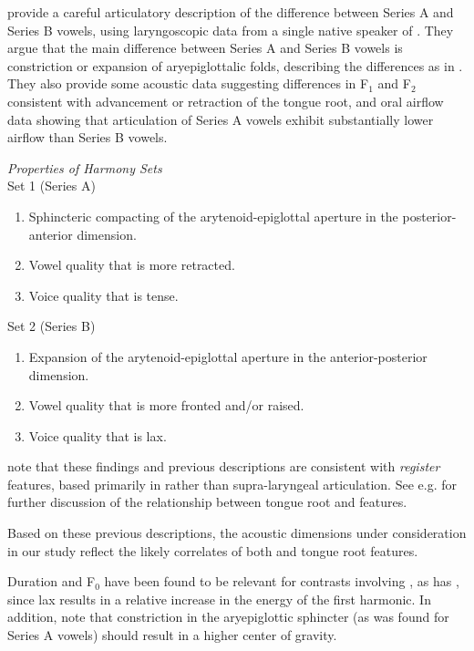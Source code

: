 \documentclass[output=paper
,newtxmath
,modfonts
,nonflat]{langsci/langscibook}
\begin{document}
\cite{Edmondsonetal2004} provide a careful articulatory description of the difference between Series A and Series B vowels, using laryngoscopic data from a single native speaker of .  They argue that the main difference between Series A and Series B vowels is constriction or expansion of aryepiglottalic folds, describing the differences as in .  They also provide some acoustic data suggesting differences in F$_1$ and F$_2$ consistent with advancement or retraction of the tongue root, and oral airflow data showing that articulation of Series A vowels exhibit substantially lower airflow than Series B vowels.

\ea\label{ex:kbgy:1} \emph{Properties of Harmony Sets \citep{Edmondsonetal2004}}\\
{Set 1 (Series A)}
\begin{enumerate}
\item Sphincteric compacting of the arytenoid-epiglottal aperture in the posterior-anterior dimension.
\item Vowel quality that is more retracted.
\item Voice quality that is tense.
\end{enumerate}
{Set 2 (Series B)}
\begin{enumerate}
\item Expansion of the arytenoid-epiglottal aperture in the anterior-posterior dimension.
\item Vowel quality that is more fronted and/or raised.
\item Voice quality that is lax.
\end{enumerate}
\z

\cite{Edmondsonetal2004} note that these findings and previous descriptions are consistent with \textit{register} features, based primarily in  rather than supra-laryngeal articulation.  See e.g. \citet{Trigo1991} for further discussion of the relationship between tongue root and  features. 

Based on these previous descriptions, the acoustic dimensions under consideration in our study reflect the likely correlates of both  and tongue root features.  

Duration and F$_0$ have been found to be relevant for contrasts involving  \citep{EdmondsonLi1994,HalleStevens1969}, as has  \citep{Kingstonetal1997}, since lax  results in a relative increase in the energy of the first harmonic.  In addition, \cite{Edmondsonetal2007} note that constriction in the aryepiglottic sphincter (as was found for Series A vowels) should result in a higher center of gravity.
\end{document}
